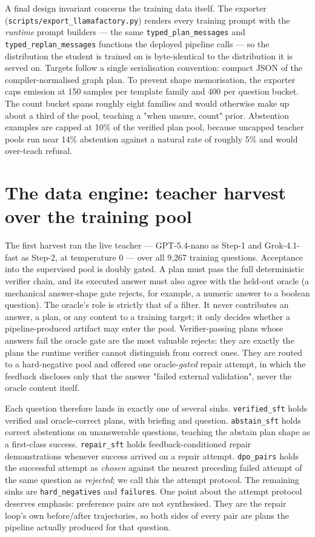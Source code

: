 \documentclass[10pt]{article} %
\begin{document}
A final design invariant concerns the training data itself. The exporter
(\texttt{scripts/export\_llamafactory.py}) renders every training prompt with the \emph{runtime} prompt
builders --- the same \texttt{typed\_plan\_messages} and \texttt{typed\_replan\_messages} functions the deployed
pipeline calls --- so the distribution the student is trained on is byte-identical to the
distribution it is served on. Targets follow a single serialisation convention: compact JSON
of the compiler-normalised graph plan. To prevent shape memorisation, the exporter caps
emission at 150 samples per template family and 400 per question bucket. The count bucket
spans roughly eight families and would otherwise make up about a third of the pool, teaching a
"when unsure, count" prior. Abstention examples are capped at 10\% of the verified plan pool,
because uncapped teacher pools run near 14\% abstention against a natural rate of roughly 5\%
and would over-teach refusal.

\section{The data engine: teacher harvest over the training pool}\label{sec:the-data-engine-teacher-harvest-over-the}

The first harvest ran the live teacher --- GPT-5.4-nano as Step-1 and Grok-4.1-fast as Step-2,
at temperature 0 --- over all 9,267 training questions. Acceptance into the supervised pool is
doubly gated. A plan must pass the full deterministic verifier chain, and its executed answer
must also agree with the held-out oracle (a mechanical answer-shape gate rejects, for example,
a numeric answer to a boolean question). The oracle's role is strictly that of a filter. It
never contributes an answer, a plan, or any content to a training target; it only decides
whether a pipeline-produced artifact may enter the pool. Verifier-passing plans whose answers
fail the oracle gate are the most valuable rejects: they are exactly the plans the runtime
verifier cannot distinguish from correct ones. They are routed to a hard-negative pool and
offered one oracle-\emph{gated} repair attempt, in which the feedback discloses only that the
answer "failed external validation", never the oracle content itself.

Each question therefore lands in exactly one of several sinks. \texttt{verified\_sft} holds verified
and oracle-correct plans, with briefing and question. \texttt{abstain\_sft} holds correct abstentions
on unanswerable questions, teaching the abstain plan shape as a first-class success.
\texttt{repair\_sft} holds feedback-conditioned repair demonstrations whenever success arrived on a
repair attempt. \texttt{dpo\_pairs} holds the successful attempt as \emph{chosen} against the nearest
preceding failed attempt of the same question as \emph{rejected}; we call this the attempt
protocol. The remaining sinks are \texttt{hard\_negatives} and \texttt{failures}. One point about the attempt
protocol deserves emphasis: preference pairs are not synthesised. They are the repair loop's
own before/after trajectories, so both sides of every pair are plans the pipeline actually
produced for that question.
\end{document}
